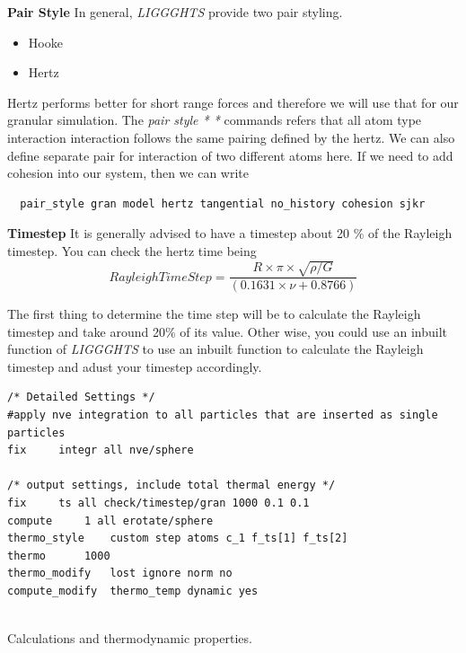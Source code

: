 \documentclass{tufte-book} %
\newcommand{\Li}{\textit{LIGGGHTS}\xspace}
\begin{document}
\textbf{Pair Style}
In general, \Li provide two pair styling.
\begin{itemize}
\item Hooke
\item Hertz
\end{itemize}
Hertz performs better for short range forces and therefore we will use that for our granular simulation. 
The \textit{pair style * *} commands refers that all atom type interaction interaction follows the same pairing defined by the hertz. We can also define separate pair for interaction of two different atoms here. If we need to add cohesion into our system, then we can write
\begin{verbatim}
  pair_style gran model hertz tangential no_history cohesion sjkr 
\end{verbatim}
\textbf{Timestep} It is generally advised to have a timestep about 20 \% of the Rayleigh timestep. You can check the hertz time being
$$ Rayleigh Time Step =  \frac{R\times\pi\times\sqrt{\rho/G}}{(0.1631\times\nu + 0.8766)} $$

The first thing to determine the time step will be to calculate the Rayleigh timestep and take around 20\% of its value. Other wise, you could use an inbuilt function of \Li to use an inbuilt function to calculate the Rayleigh timestep and adust your timestep accordingly.


\begin{verbatim}
/* Detailed Settings */
#apply nve integration to all particles that are inserted as single particles
fix		integr all nve/sphere

/* output settings, include total thermal energy */
fix		ts all check/timestep/gran 1000 0.1 0.1
compute		1 all erotate/sphere
thermo_style	custom step atoms c_1 f_ts[1] f_ts[2]  
thermo		1000
thermo_modify	lost ignore norm no
compute_modify	thermo_temp dynamic yes


\end{verbatim}

 Calculations and thermodynamic properties.
 
\end{document}

